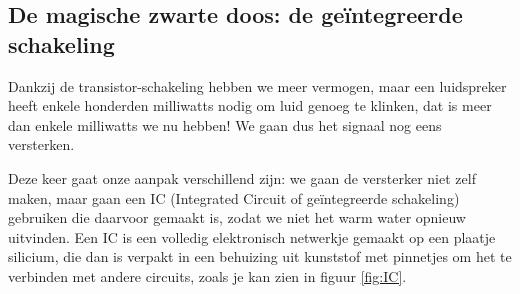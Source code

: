 \documentclass{article}
\begin{document}
		\subsection{De magische zwarte doos: de ge\"integreerde schakeling}
			Dankzij de transistor-schakeling hebben we meer vermogen, maar een luidspreker heeft enkele honderden milliwatts nodig om luid genoeg te klinken, dat is meer dan enkele milliwatts we nu hebben! We gaan dus het signaal nog eens versterken.

			Deze keer gaat onze aanpak verschillend zijn: we gaan de versterker niet zelf maken, maar gaan een IC (Integrated Circuit of ge\"integreerde schakeling) gebruiken die daarvoor gemaakt is, zodat we niet het warm water opnieuw uitvinden. Een IC is een volledig elektronisch netwerkje gemaakt op een plaatje silicium, die dan is verpakt in een behuizing uit kunststof met pinnetjes om het te verbinden met andere circuits, zoals je kan zien in figuur \ref{fig:IC}.
\end{document}
